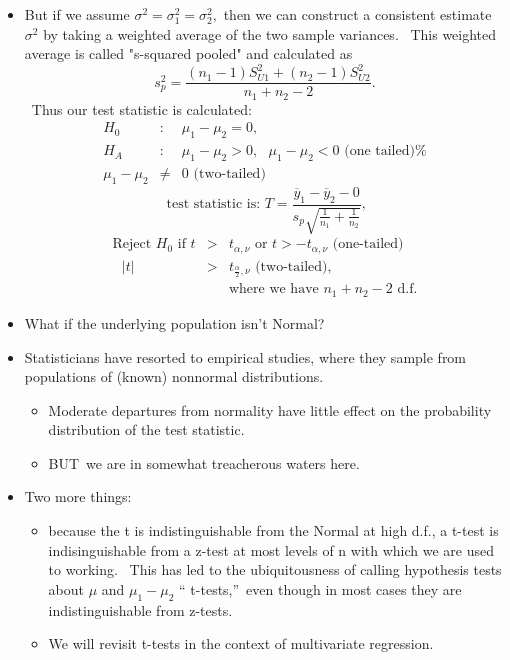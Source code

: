 \documentclass[11pt]{article}
\begin{document}
\begin{itemize}
\item But if we assume $\sigma ^{2}=\sigma _{1}^{2}=\sigma _{2}^{2},$ then
we can construct a consistent estimate $\sigma ^{2}$ by taking a weighted
average of the two sample variances. \ This weighted average is called
"s-squared pooled" and calculated as%
\begin{equation*}
s_{p}^{2}=\frac{\left( n_{1}-1\right) S_{U1}^{2}+\left( n_{2}-1\right)
S_{U2}^{2}}{n_{1}+n_{2}-2}.
\end{equation*}%
\ Thus our test statistic is calculated:%
\begin{eqnarray*}
H_{0} &:&\mu _{1}-\mu _{2}=0, \\
H_{A} &:&\mu _{1}-\mu _{2}>0,\text{ }\mu _{1}-\mu _{2}<0\text{ \ (one tailed)%
} \\
\mu _{1}-\mu _{2} &\neq &0\text{ \ (two-tailed)}
\end{eqnarray*}%
\begin{equation*}
\text{ test statistic is: }T=\frac{\overline{y}_{1}-\overline{y}_{2}-0}{s_{p}%
\sqrt{\frac{1}{n_{1}}+\frac{1}{n_{2}}}},
\end{equation*}%
\begin{eqnarray*}
\text{Reject }H_{0}\text{ if }t &>&t_{\alpha ,\nu }\text{ or }t>-t_{\alpha
,\nu }\text{ \ (one-tailed)} \\
\text{ }|t| &>&t_{\frac{\alpha }{2},\nu }\text{ \ (two-tailed),} \\
&&\text{where we have }n_{1}+n_{2}-2\text{ \ d.f.}
\end{eqnarray*}

\item What if the underlying population isn't Normal?

\item Statisticians have resorted to empirical studies, where they sample
from populations of (known) nonnormal distributions. \ 

\begin{itemize}
\item Moderate departures from normality have little effect on the
probability distribution of the test statistic.

\item BUT\ we are in somewhat treacherous waters here.
\end{itemize}

\item Two more things:

\begin{itemize}
\item because the t is indistinguishable from the Normal at high d.f., a
t-test is indisinguishable from a z-test at most levels of n with which we
are used to working. \ This has led to the ubiquitousness of calling
hypothesis tests about $\mu $ and $\mu _{1}-\mu _{2}$ \textquotedblleft
t-tests,\textquotedblright\ even though in most cases they are
indistinguishable from z-tests.

\item We will revisit t-tests in the context of multivariate regression.
\end{itemize}
\end{itemize}
\end{document}
